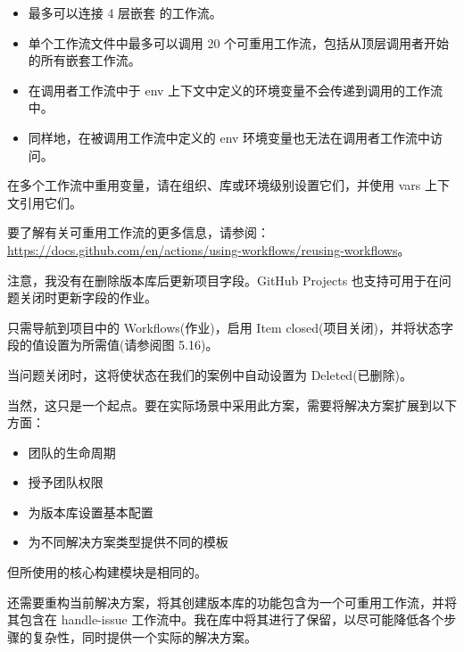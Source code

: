 \begin{itemize}
\item 
最多可以连接 4 层嵌套 的工作流。

\item 
单个工作流文件中最多可以调用 20 个可重用工作流，包括从顶层调用者开始的所有嵌套工作流。

\item 
在调用者工作流中于 env 上下文中定义的环境变量不会传递到调用的工作流中。

\item 
同样地，在被调用工作流中定义的 env 环境变量也无法在调用者工作流中访问。
\end{itemize}

在多个工作流中重用变量，请在组织、库或环境级别设置它们，并使用 vars 上下文引用它们。

要了解有关可重用工作流的更多信息，请参阅：\url{https://docs.github.com/en/actions/using-workflows/reusing-workflows}。

注意，我没有在删除版本库后更新项目字段。GitHub Projects 也支持可用于在问题关闭时更新字段的作业。

只需导航到项目中的 Workflows(作业)，启用 Item closed(项目关闭)，并将状态字段的值设置为所需值(请参阅图 5.16)。


当问题关闭时，这将使状态在我们的案例中自动设置为 Deleted(已删除)。


当然，这只是一个起点。要在实际场景中采用此方案，需要将解决方案扩展到以下方面：

\begin{itemize}
\item 
团队的生命周期

\item 
授予团队权限

\item 
为版本库设置基本配置

\item 
为不同解决方案类型提供不同的模板
\end{itemize}

但所使用的核心构建模块是相同的。

还需要重构当前解决方案，将其创建版本库的功能包含为一个可重用工作流，并将其包含在 handle-issue 工作流中。我在库中将其进行了保留，以尽可能降低各个步骤的复杂性，同时提供一个实际的解决方案。



















